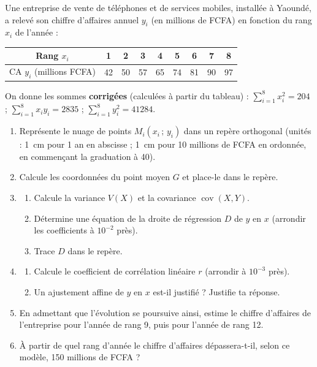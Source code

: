 \documentclass[11pt]{article}
\begin{document}
\begin{exercice}\label{exo:bac-telecom}
Une entreprise de vente de téléphones et de services mobiles, installée à Yaoundé, a relevé son chiffre d'affaires annuel $y_i$ (en millions de FCFA) en fonction du rang $x_i$ de l'année :

\begin{center}
\begin{tabular}{|c|cccccccc|}
\hline
\rowcolor{popblueL} Rang $x_i$ & 1 & 2 & 3 & 4 & 5 & 6 & 7 & 8 \\
\hline
CA $y_i$ (millions FCFA) & 42 & 50 & 57 & 65 & 74 & 81 & 90 & 97 \\
\hline
\end{tabular}
\end{center}

On donne les sommes \textbf{corrigées} (calculées à partir du tableau) :
$\displaystyle\sum_{i=1}^{8}x_i^2=204$ ; $\displaystyle\sum_{i=1}^{8}x_iy_i=2835$ ; $\displaystyle\sum_{i=1}^{8}y_i^2=41284$.

\begin{enumerate}
\item Représente le nuage de points $M_i(x_i\,;\,y_i)$ dans un repère orthogonal (unités : \SI{1}{cm} pour 1 an en abscisse ; \SI{1}{cm} pour 10 millions de FCFA en ordonnée, en commençant la graduation à 40).
\item Calcule les coordonnées du point moyen $G$ et place-le dans le repère.
\item \begin{enumerate}
\item Calcule la variance $V(X)$ et la covariance $\operatorname{cov}(X,Y)$.
\item Détermine une équation de la droite de régression $D$ de $y$ en $x$ (arrondir les coefficients à $10^{-2}$ près).
\item Trace $D$ dans le repère.
\end{enumerate}
\item \begin{enumerate}
\item Calcule le coefficient de corrélation linéaire $r$ (arrondir à $10^{-3}$ près).
\item Un ajustement affine de $y$ en $x$ est-il justifié ? Justifie ta réponse.
\end{enumerate}
\item En admettant que l'évolution se poursuive ainsi, estime le chiffre d'affaires de l'entreprise pour l'année de rang 9, puis pour l'année de rang 12.
\item À partir de quel rang d'année le chiffre d'affaires dépassera-t-il, selon ce modèle, 150 millions de FCFA ?
\end{enumerate}
\end{exercice}
\end{document}
